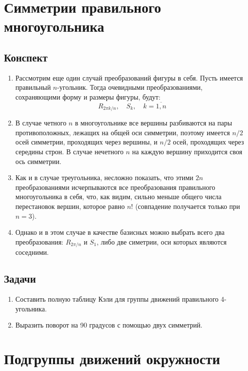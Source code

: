 \section{Симметрии правильного многоугольника}

\subsection{Конспект}
\begin{enumerate}\setlength{\itemsep}{1pt}
\item Рассмотрим еще один случай преобразований фигуры в себя. Пусть имеется правильный $n$-угольник. Тогда очевидными преобразованиями, сохраняющими форму и размеры фигуры, будут:
$$
R_{2\pi k/n},\quad S_k,\quad k=\overline{1,n}
$$
\item В случае четного $n$ в многоугольнике все вершины разбиваются на пары противоположных, лежащих на общей оси симметрии, поэтому имеется $n/2$ осей симметрии, проходящих через вершины, и $n/2$ осей, проходящих через середины строн. В случае нечетного $n$ на каждую вершину приходится своя ось симметрии.
\item Как и в случае треугольника, несложно показать, что этими $2n$ преобразованиями исчерпываются все преобразования правильного многоугольника в себя, что, как видим, сильно меньше общего числа перестановок вершин, которое равно $n!$ (совпадение получается только при $n=3$).
\item Однако и в этом случае в качестве базисных можно выбрать всего два преобразования: $R_{2\pi/n}$ и $S_1$, либо две симетрии, оси которых являются соседними.
\end{enumerate}
\subsection{Задачи}
\begin{enumerate}
\item Составить полную таблицу Кэли для группы движений правильного 4-угольника.
\item Выразить поворот на 90 градусов с помощью двух симметрий.
\end{enumerate}


\section{Подгруппы движений окружности}

